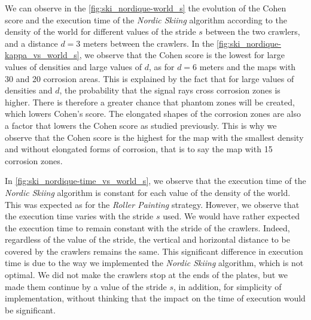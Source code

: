 We can observe in the \ref{fig:ski_nordique-world_s} the evolution of the Cohen score and the execution time of the \textit{Nordic Skiing} algorithm according to the density of the world for different values of the stride $s$ between the two crawlers, and a distance $d = 3$ meters between the crawlers.
In the \ref{fig:ski_nordique-kappa_vs_world_s}, we observe that the Cohen score is the lowest for large values of densities and large values of $d$, as for $d = 6$ meters and the maps with 30 and 20 corrosion areas.
This is explained by the fact that for large values of densities and $d$, the probability that the signal rays cross corrosion zones is higher.
There is therefore a greater chance that phantom zones will be created, which lowers Cohen's score.
The elongated shapes of the corrosion zones are also a factor that lowers the Cohen score as studied previously.
This is why we observe that the Cohen score is the highest for the map with the smallest density and without elongated forms of corrosion, that is to say the map with 15 corrosion zones.

In \ref{fig:ski_nordique-time_vs_world_s}, we observe that the execution time of the \textit{Nordic Skiing} algorithm is constant for each value of the density of the world.
This was expected as for the \textit{Roller Painting} strategy.
However, we observe that the execution time varies with the stride $s$ used.
We would have rather expected the execution time to remain constant with the stride of the crawlers.
Indeed, regardless of the value of the stride, the vertical and horizontal distance to be covered by the crawlers remains the same.
This significant difference in execution time is due to the way we implemented the \textit{Nordic Skiing} algorithm, which is not optimal.
We did not make the crawlers stop at the ends of the plates, but we made them continue by a value of the stride $s$, in addition, for simplicity of implementation, without thinking that the impact on the time of execution would be significant.

